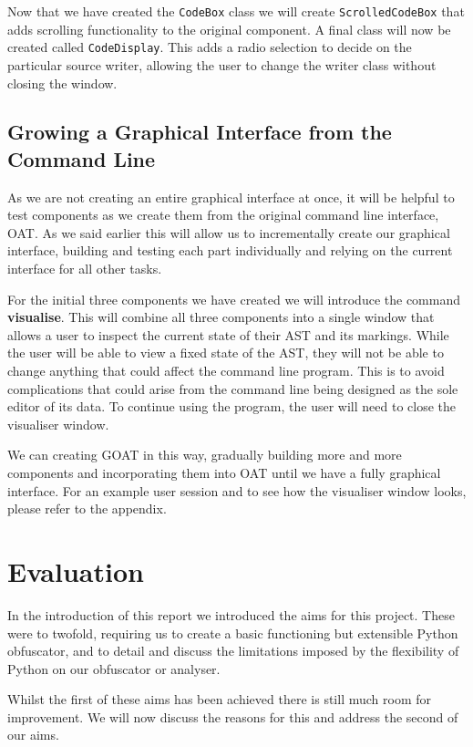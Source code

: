 \documentclass[twoside,a4paper]{report}
\begin{document}
Now that we have created the \texttt{CodeBox} class we will create \texttt{ScrolledCodeBox} that adds scrolling functionality to the original component.
A final class will now be created called \texttt{CodeDisplay}. This adds a radio selection to decide on the particular source writer, allowing the user
to change the writer class without closing the window.

\subsection{Growing a Graphical Interface from the Command Line}

As we are not creating an entire graphical interface at once, it will be helpful to test components as we create them from the original command
line interface, OAT. As we said earlier this will allow us to incrementally create our graphical interface, building and testing each part individually
and relying on the current interface for all other tasks.

For the initial three components we have created we will introduce the command \textbf{visualise}. This will combine all three components into a single
window that allows a user to inspect the current state of their AST and its markings. While the user will be able to view a fixed state of the AST, they
will not be able to change anything that could affect the command line program. This is to avoid complications that could arise from the command line
being designed as the sole editor of its data. To continue using the program, the user will need to close the visualiser window.

We can creating GOAT in this way, gradually building more and more components and incorporating them into OAT until we have a fully graphical interface.
For an example user session and to see how the visualiser window looks, please refer to the appendix.

\section{Evaluation}

In the introduction of this report we introduced the aims for this project. These were to twofold, requiring us to create a basic functioning but extensible
Python obfuscator, and to detail and discuss the limitations imposed by the flexibility of Python on our obfuscator or analyser.

Whilst the first of these aims has been achieved there is still much room for improvement. We will now discuss the reasons for this and address the second
of our aims.
\end{document}
